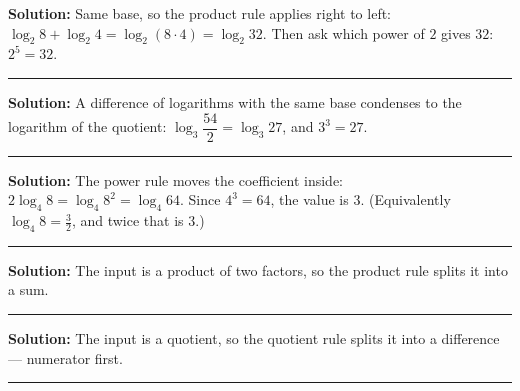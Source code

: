 \documentclass[12pt]{article}
\begin{document}



\textbf{Solution:} Same base, so the product rule applies right to left:
$\log_2 8 + \log_2 4 = \log_2(8 \cdot 4) = \log_2 32$. Then ask which power of
$2$ gives $32$: $2^5 = 32$. 

\vspace{0.2cm}\noindent\rule{\linewidth}{0.2pt}\vspace{0.2cm}


\textbf{Solution:} A difference of logarithms with the same base condenses to the
logarithm of the quotient: $\log_3\!\dfrac{54}{2} = \log_3 27$, and $3^3 = 27$.

\vspace{0.2cm}\noindent\rule{\linewidth}{0.2pt}\vspace{0.2cm}


\textbf{Solution:} The power rule moves the coefficient inside:
$2\log_4 8 = \log_4 8^2 = \log_4 64$. Since $4^3 = 64$, the value is $3$.
(Equivalently $\log_4 8 = \tfrac{3}{2}$, and twice that is $3$.) 

\vspace{0.2cm}\noindent\rule{\linewidth}{0.2pt}\vspace{0.2cm}


\textbf{Solution:} The input is a product of two factors, so the product rule
splits it into a sum. 

\vspace{0.2cm}\noindent\rule{\linewidth}{0.2pt}\vspace{0.2cm}


\textbf{Solution:} The input is a quotient, so the quotient rule splits it into a
difference --- numerator first. 

\vspace{0.2cm}\noindent\rule{\linewidth}{0.2pt}\vspace{0.2cm}

\end{document}
